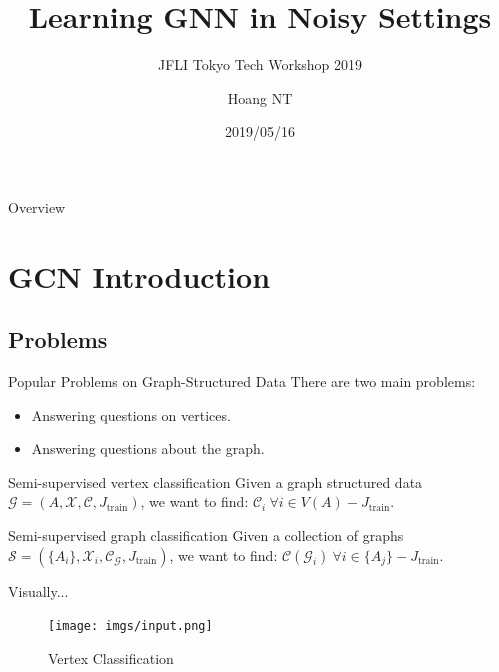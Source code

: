 \documentclass{beamer}
\title{Learning GNN in Noisy Settings}
\subtitle{JFLI Tokyo Tech Workshop 2019}
\author{Hoang NT}
\institute{Murata Laboratory \\ Tokyo Tech \vspace{4em}}
\date{2019/05/16}
\begin{document}
    \begin{frame}
        \maketitle
    \end{frame}

    \begin{frame}{Overview}
        \tableofcontents
    \end{frame}

    \section{GCN Introduction}

    \subsection{Problems}

    \begin{frame}{Popular Problems on Graph-Structured Data}
        There are two main problems:
        \pause
        \begin{itemize}
            \item Answering questions on vertices.
            \pause
            \item Answering questions about the graph.
        \end{itemize}
        \pause
        \vspace{1em}
        \begin{block}{Semi-supervised vertex classification}
            Given a graph structured data $\mathcal{G} = (A, \mathcal{X}, \mathcal{C}, J_{\text{train}})$,
            we want to find: $\mathcal{C}_i \ \forall i \in V(A) - J_{\text{train}}$.
        \end{block}
        \vspace{1em}
        \begin{block}{Semi-supervised graph classification}
            Given a collection of graphs $\mathcal{S} = (\{A_i\}, \mathcal{X}_i, \mathcal{C}_\mathcal{G}, J_{\text{train}})$,
            we want to find: $\mathcal{C}(\mathcal{G}_i) \ \forall i \in \{A_j\} - J_{\text{train}}$.
        \end{block}
    \end{frame}

    \begin{frame}{Visually...}
        \begin{figure}
            \centering
            \texttt{[image: imgs/input.png]}
            \caption{Vertex Classification~\cite{sgc}}
            \label{fig:input}
        \end{figure}
    \end{frame}
\end{document}
